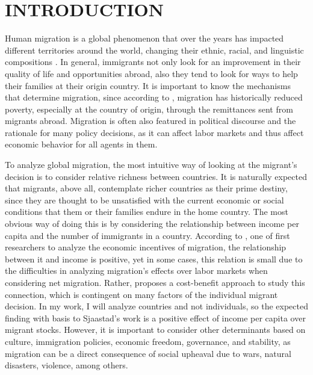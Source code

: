 \documentclass[../main.tex]{subfiles}
\begin{document}
\section{INTRODUCTION}
Human migration is a global phenomenon that over the years has impacted different territories around the world, changing their ethnic, racial, and linguistic compositions \parencite{EncyclopaediaBritannica.2021b}. In general, immigrants not only look for an improvement in their quality of life and opportunities abroad, also they tend to look for ways to help their families at their origin country. It is important to know the mechanisms that determine migration, since according to \textcite{Murrugarra.2011}, migration has historically reduced poverty, especially at the country of origin, through the remittances sent from migrants abroad. Migration is often also featured in political discourse and the rationale for many policy decisions, as it can affect labor markets \parencite{Abel.2014} and thus affect economic behavior for all agents in them. 

To analyze global migration, the most intuitive way of looking at the migrant’s decision is
to consider relative richness between countries. It is naturally expected that migrants, above all,
contemplate richer countries as their prime destiny, since they are thought to be unsatisfied with the current economic or social conditions that them or their families endure in the home country. 
The most obvious way of doing this is by considering the relationship between income per capita and the number of immigrants in a country. According to \textcite{Sjaastad.1962}, one of first researchers to analyze the economic incentives of migration, the relationship between it and income is positive, yet in some cases, this relation is small due to the difficulties in analyzing migration’s effects over labor markets when considering net migration. Rather, \textcite{Sjaastad.1962} proposes a cost-benefit approach to study this connection, which is contingent on many factors of the individual migrant decision. In my work, I will analyze countries and not individuals, so the expected finding with basis to Sjaastad's work is a positive effect of income per capita over migrant stocks. However, it is important to consider other determinants based on culture, immigration policies, economic freedom, governance, and stability, as migration can be a direct consequence of social upheaval due to wars, natural disasters, violence, among others. 
\end{document}
